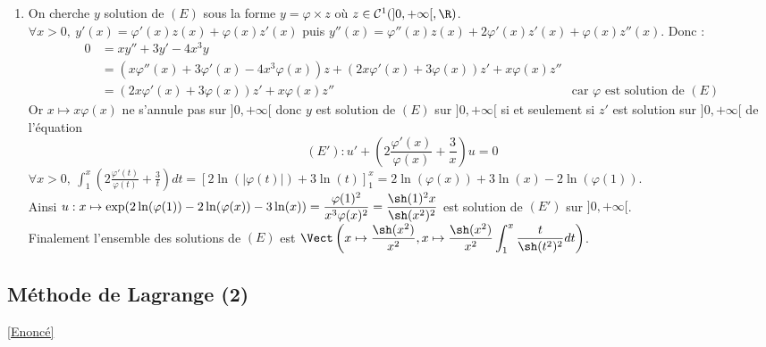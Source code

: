 \documentclass{book}
\begin{document}
\begin{enumerate}[leftmargin=*]
		Autrement dit $\forall x\in I\backslash\{0\},\ \varphi(x)=\displaystyle\sum_{n=0}^{+\infty}a_{4n}x^{4n}=\sum_{n=0}^{+\infty}\frac{a_0}{(2n+1)!}x^{4n}=\frac{a_0}{x^2}\sum_{n=0}^{+\infty}\frac{(x^2)^{2n+1}}{(2n+1)!}=a_0\frac{\sh(x^2)}{x^2}$.\\
		On vérifie que $x\mapsto \dfrac{\sh(x^2)}{x^2}$ est solution de $(E)$ sur $]0,+\infty[$.
		\item On cherche $y$ solution de $(E)$ sous la forme $y=\varphi\times z$ où $z\in \mathcal C^1(]0,+\infty[,\R)$.\\
		$\forall x>0,\ y'(x)=\varphi'(x)z(x)+\varphi(x)z'(x)$ puis $y''(x)=\varphi''(x)z(x)+2\varphi'(x)z'(x)+\varphi(x)z''(x)$. Donc :
		\begin{align*}
			0&=xy''+3y'-4x^3y\\
			&=(x\varphi''(x)+3\varphi'(x)-4x^3\varphi(x))z+(2x\varphi'(x)+3\varphi(x))z'+x\varphi(x) z''\\
			&=(2x\varphi'(x)+3\varphi(x))z'+x\varphi(x) z'' & \text{car }\varphi\text{ est solution de }(E)
		\end{align*}
		Or $x\mapsto x\varphi(x)$ ne s'annule pas sur $]0,+\infty[$ donc $y$ est solution de $(E)$ sur $]0,+\infty[$ si et seulement si $z'$ est solution sur $]0,+\infty[$ de l'équation
		$$(E') : u'+\displaystyle\left(2\frac{\varphi'(x)}{\varphi(x)}+\frac{3}{x}\right)u=0$$
		$\forall x>0,\ \displaystyle\int_1^x\left(2\frac{\varphi'(t)}{\varphi(t)}+\frac{3}{t}\right)dt=\left[2\ln(|\varphi(t)|)+3\ln(t)\right]_1^x=2\ln(\varphi(x))+3\ln(x)-2\ln(\varphi(1))$.\\
		Ainsi $u:x\mapsto \exp(2\ln(\varphi(1))-2\ln(\varphi(x))-3\ln(x))=\dfrac{\varphi(1)^2}{x^3\varphi(x)^2}=\dfrac{\sh(1)^2x}{\sh(x^2)^2}$ est solution de $(E')$ sur $]0,+\infty[$.\\
		Finalement l'ensemble des solutions de $(E)$ est $\displaystyle\Vect\left(x\mapsto \frac{\sh(x^2)}{x^2},x\mapsto \frac{\sh(x^2)}{x^2}\int_1^x\frac{t}{\sh(t^2)^2}dt\right)$.
	\end{enumerate}
	
	\subsection{Méthode de Lagrange (2)}
	\label{sec:methode-de-lagrange-2}
	\textcolor{blue}{\hyperref[Méthode de Lagrange 2]{[Enoncé]}}\\
	
\end{document}
